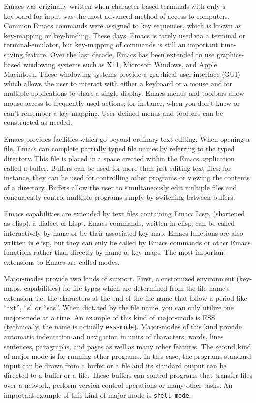 \documentclass{article}
\newcommand{\stexttt}[1]{{\small\texttt{#1}}}
\begin{document}
Emacs was originally written when character-based terminals with only a 
keyboard for input was the most advanced method of access to computers.  
Common Emacs commands were assigned to key sequences, which is known as 
key-mapping or key-binding.  These days, Emacs is rarely used via a 
terminal or terminal-emulator, but key-mapping of commands is still
an important time-saving feature.
Over the last decade,
Emacs has been extended to use graphics-based windowing systems such as X11,
Microsoft Windows, and Apple Macintosh.  These windowing systems
provide a graphical user interface (GUI) which allows the user to
interact with either a keyboard or a mouse and for multiple 
applications to share a single display.  Emacs menus and
toolbars allow mouse access to frequently used actions; for instance,
when you don't know or can't remember a key-mapping.
User-defined menus and toolbars can be constructed as needed.

Emacs provides facilities which go beyond ordinary text editing.  
When opening a file, Emacs can complete partially typed 
file names by referring to the typed directory.  This file is placed
in a space created within the Emacs application called a buffer.
Buffers can be used for more than just editing text files; for instance,
they can be used for controlling other programs or viewing the contents of
a directory.  Buffers allow the user to simultaneously edit multiple files
and concurrently control multiple programs simply by switching between buffers.

Emacs capabilities are extended by text files containing Emacs Lisp,
(shortened as elisp), a dialect of Lisp
\citep{RChassell1999,PGraham:1996}.  Emacs commands, written
in elisp, can be called interactively by name or by their associated key-map.  
Emacs functions are also written in elisp, but they can only be 
called by Emacs commands or other Emacs functions rather than directly
by name or key-maps.  The most important extensions to
Emacs are called modes.  

Major-modes provide two kinds of support.
First, a customized environment (key-maps, capabilities) for file
types which are determined from the file name's extension, i.e. the characters
at the end of the file name that follow a period like ``txt'', ``s''
or ``sas''.  When dictated by the file name, you can only utilize one 
major-mode at a time.  An example of this kind of major-mode is ESS 
(technically, the name is actually \stexttt{ess-mode}).  Major-modes of this
kind provide automatic indentation and navigation in units of characters,
words, lines, sentences, paragraphs, and pages as well as many other
features.  The second kind of major-mode is for running other programs.  
In this case, the programs standard input can be drawn from a buffer
or a file and its standard output can be directed to a buffer or a file.  
These buffers can control programs that transfer files over a network,
perform version control operations or many other tasks.
An important example of this kind of major-mode is \stexttt{shell-mode}.
\end{document}
